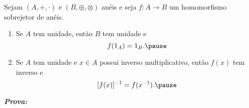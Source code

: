 \documentclass{beamer}
\begin{document}
    \begin{frame}
        \begin{proposicao}
            Sejam $(A, +, \cdot)$ e $(B, \oplus, \otimes)$ an\'eis \pause e seja $f : A \to B$ um homomorfismo sobrejetor de an\'eis.\pause
            \begin{enumerate}[label={\roman*})]
                \item Se $A$ tem unidade, \pause ent\~ao $B$ tem unidade e\pause
                \[
                    f(1_A) = 1_B.\pause
                \]

                \vspace{.5cm}

                \item Se $A$ tem unidade \pause e $x \in A$ \pause possui inverso multiplicativo, \pause ent\~ao $f(x)$ \pause tem inverso e\pause
                \[
                    [f(x)]^{-1} = f(x^{-1}).\pause
                \]

                \vspace{.5cm}
            \end{enumerate}
        \end{proposicao}
    \end{frame}

    \begin{frame}
        \noindent \textbf{\textit{Prova: }}
        \vspace{6.5cm}
    \end{frame}
\end{document}
